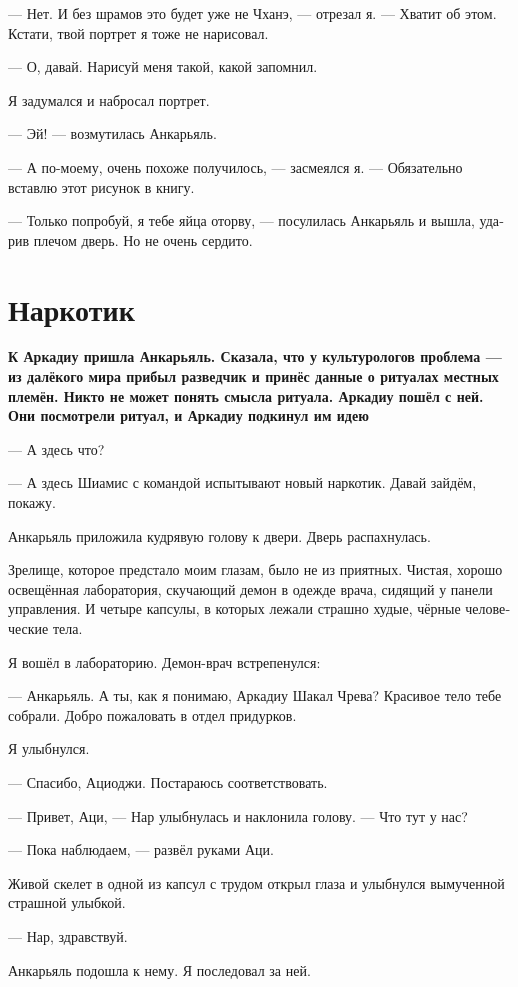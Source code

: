 \documentclass[a4paper,12pt,fleqn]{book}\usepackage{cooltooltips}\usepackage{polyglossia}\setdefaultlanguage[babelshorthands=true]{russian}\setotherlanguage{english}\defaultfontfeatures{Ligatures=TeX,Mapping=tex-text} \usepackage{xcolor}\definecolor{lightgray}{HTML}{bbbbbb}\color{lightgray}\newcommand{\ml}[3]{\textenglish{\textcolor{black}{#3}}}
\begin{document}
{--- Нет.
И без шрамов это будет уже не Чханэ, --- отрезал я.
--- Хватит об этом.
Кстати, твой портрет я тоже не нарисовал.

--- О, давай.
Нарисуй меня такой, какой запомнил.

Я задумался и набросал портрет.

--- Эй! --- возмутилась Анкарьяль.

--- А по-моему, очень похоже получилось, --- засмеялся я.
--- Обязательно вставлю этот рисунок в книгу.

--- Только попробуй, я тебе яйца оторву, --- посулилась Анкарьяль и вышла, ударив плечом дверь.
Но не очень сердито.

\section{Наркотик}

\textbf{К Аркадиу пришла Анкарьяль.
Сказала, что у культурологов проблема --- из далёкого мира прибыл разведчик и принёс данные о ритуалах местных племён.
Никто не может понять смысла ритуала.
Аркадиу пошёл с ней.
Они посмотрели ритуал, и Аркадиу подкинул им идею}

--- А здесь что?

--- А здесь Шиамис с командой испытывают новый наркотик.
Давай зайдём, покажу.

Анкарьяль приложила кудрявую голову к двери.
Дверь распахнулась.

Зрелище, которое предстало моим глазам, было не из приятных.
Чистая, хорошо освещённая лаборатория, скучающий демон в одежде врача, сидящий у панели управления.
И четыре капсулы, в которых лежали страшно худые, чёрные человеческие тела.

Я вошёл в лабораторию.
Демон-врач встрепенулся:

--- Анкарьяль.
А ты, как я понимаю, Аркадиу Шакал Чрева?
Красивое тело тебе собрали.
Добро пожаловать в отдел придурков.

Я улыбнулся.

--- Спасибо, Ациоджи.
Постараюсь соответствовать.

--- Привет, Аци, --- Нар улыбнулась и наклонила голову.
--- Что тут у нас?

--- Пока наблюдаем, --- развёл руками Аци.

Живой скелет в одной из капсул с трудом открыл глаза и улыбнулся вымученной страшной улыбкой.

--- Нар, здравствуй.

Анкарьяль подошла к нему.
Я последовал за ней.

}
\end{document}

